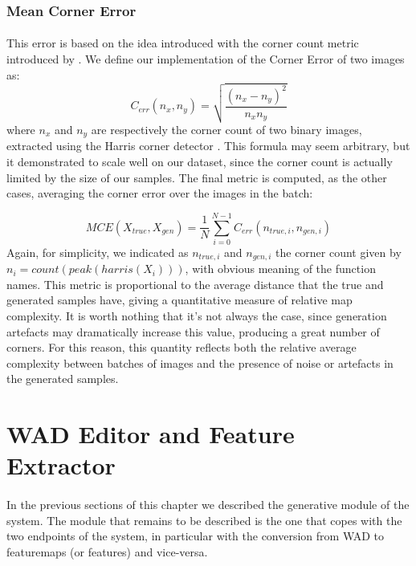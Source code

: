 \subsubsection{Mean Corner Error}
\paragraph{} This error is based on the idea introduced with the corner count metric introduced by \cite{slam}. We define our implementation of the Corner Error of two images as:
\begin{equation}
C_{err}(n_{x}, n_{y}) = \sqrt{\frac{(n_{x} - n_{y})^2}{n_{x}n_{y}}}
\end{equation}
where $n_{x}$ and $n_{y}$ are respectively the corner count of two binary images, extracted using the Harris corner detector \cite{harrisdetector}.
This formula may seem arbitrary, but it demonstrated to scale well on our dataset, since the corner count is actually limited by the size of our samples. The final metric is computed, as the other cases, averaging the corner error over the images in the batch:

\begin{equation}
MCE(X_{true}, X_{gen}) = \frac{1}{N} \sum_{i=0}^{N-1} C_{err}(n_{true,i}, n_{gen,i})
\end{equation}
Again, for simplicity, we indicated as $ n_{true,i} $ and $ n_{gen,i} $ the corner count given by \\ $ n_{i} = count(peak(harris(X_{i}))) $, with obvious meaning of the function names.
This metric is proportional to the average distance that the true and generated samples have, giving a quantitative measure of relative map complexity. It is worth nothing that it's not always the case, since generation artefacts may dramatically increase this value, producing a great number of corners. For this reason, this quantity reflects both the relative average complexity between batches of images and the presence of noise or artefacts in the generated samples.

\section{WAD Editor and Feature Extractor}
\label{sec:editor}
\paragraph{} In the previous sections of this chapter we described the generative module of the system. The module that remains to be described is the one that copes with the two endpoints of the system, in particular with the conversion from WAD to \glspl{featuremap} (or features) and vice-versa. 
